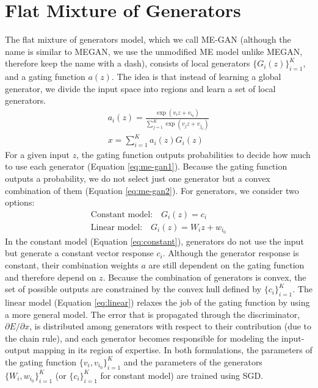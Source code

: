\documentclass[a4paper,onesided,12pt]{report}
\begin{document}
\section{Flat Mixture of Generators}
\label{sec:me-gan}
The flat mixture of generators model, which we call ME-GAN (although the name is similar to MEGAN, we use the unmodified ME model unlike MEGAN, therefore keep the name with a dash), consists of local generators $\{G_i(z)\}_{i=1}^{K}$, and a gating function $a(z)$. The idea is that instead of learning a global generator, we divide the input space into regions and learn a set of local generators.
\begin{gather}
a_i(z) = \frac{\exp{(v_i z+v_{i_0})}}{\sum_{j=1}^K \exp{(v_j z+v_{j_0})}} \label{eq:me-gan1}\\
x = \sum_{i=1}^K a_i(z) G_i(z) \label{eq:me-gan2}
\end{gather}
For a given input $z$, the gating function outputs probabilities to decide how much to use each generator (Equation \ref{eq:me-gan1}). Because the gating function outputs a probability, we do not select just one generator but a convex combination of them (Equation \ref{eq:me-gan2}). For generators, we consider two options:
\begin{gather}
\text{Constant model:} \quad G_i(z) = c_i \label{eq:constant}\\
\text{Linear model:} \quad G_i(z) = W_i z + w_{i_0} \label{eq:linear}
\end{gather}
In the constant model (Equation \ref{eq:constant}), generators do not use the input but generate a constant vector response $c_i$. Although the generator response is constant, their combination weights $a$ are still dependent on the gating function and therefore depend on $z$. Because the combination of generators is convex, the set of possible outputs are constrained by the convex hull defined by $\{c_i\}_{i=1}^K$. The linear model (Equation \ref{eq:linear}) relaxes the job of the gating function by using a more general model. The error that is propagated through the discriminator, $\partial E / \partial x$, is distributed among generators with respect to their contribution (due to the chain rule), and each generator becomes responsible for modeling the input-output mapping in its region of expertise. In both formulations, the parameters of the gating function $\{v_i, v_{i_0}\}_{i=1}^K$ and the parameters of the generators $\{W_i, w_{i_0} \}_{i=1}^K$ (or $\{ c_i \}_{i=1}^K$ for constant model) are trained using SGD.
\end{document}
